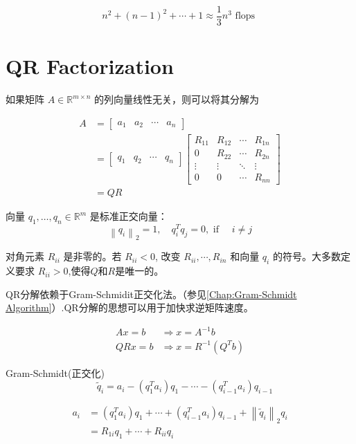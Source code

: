 $$ n^{2}+(n-1)^{2}+\cdots+1 \approx \frac{1}{3} n^{3}\text{ flops }$$ 

\section{QR Factorization}

如果矩阵 $ A \in \mathbb{R}^{m \times n} $ 的列向量线性无关，则可以将其分解为

\begin{definition}[QR Factorization]
    
    $$\begin{aligned} A&=\left[\begin{array}{llll}a_{1} & a_{2} & \cdots & a_{n}\end{array}\right]\\
    &=\left[\begin{array}{llll}q_{1} & q_{2} & \cdots & q_{n}\end{array}\right]\left[\begin{array}{cccc}R_{11} & R_{12} & \cdots & R_{1 n} \\ 0 & R_{22} & \cdots & R_{2 n} \\ \vdots & \vdots & \ddots & \vdots \\ 0 & 0 & \cdots & R_{n n}\end{array}\right]\\
    &=QR
    \end{aligned}$$

向量 $ q_{1}, \ldots, q_{n} \in \mathbb{R}^{m} $ 是标准正交向量：
$$
\left\|q_{i}\right\|_{2}=1, \quad q_{i}^{T} q_{j}=0, \text { if } \quad i \neq j
$$

对角元素 $ R_{i i} $ 是非零的。若 $ R_{i i}<0 $, 改变 $ R_{i i}, \cdots, R_{i n} $ 和向量 $ q_{i} $ 的符号。大多数定义要求 $ R_{i i}>0 $,使得$Q$和$R$是唯一的。
\end{definition}

QR分解依赖于Gram-Schmidit正交化法。（参见\ref{Chap:Gram-Schmidt Algorithm}）.QR分解的思想可以用于加快求逆矩阵速度。

$$\begin{aligned}
   Ax = b &\Rightarrow x = A^{-1} b \\
QRx = b &\Rightarrow x = R^{-1} \left(Q^Tb\right)
\end{aligned}
$$

\begin{remark}
    Gram-Schmidt(正交化) $$ \quad \widetilde{q}_{i}=a_{i}-\left(q_{1}^{T} a_{i}\right) q_{1}-\cdots-\left(q_{i-1}^{T} a_{i}\right) q_{i-1} $$

    $$ \begin{aligned}
        a_{i}&=\left(q_{1}^{T} a_{i}\right) q_{1}+\cdots+\left(q_{i-1}^{T} a_{i}\right) q_{i-1} + \left\|\tilde{q}_{i}\right\|_{2} q_{i}
        \\ &=R_{1 i} q_{1}+\cdots+R_{i i} q_{i}
    \end{aligned}
      $$
\end{remark}

